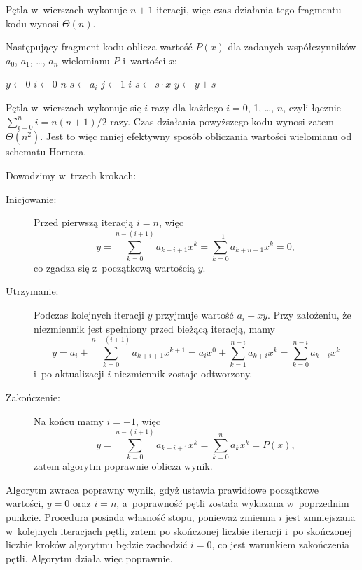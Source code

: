 
\subproblem %
Pętla  w~wierszach  wykonuje $n+1$ iteracji, więc czas działania tego fragmentu kodu wynosi $\Theta(n)$.

\subproblem %
Następujący fragment kodu oblicza wartość $P(x)$ dla zadanych współczynników $a_0$, $a_1$, \dots, $a_n$ wielomianu $P$ i~wartości $x$:
\begin{codebox}
\li	$y\gets0$
\li	\For $i\gets0$ \To $n$
\li		\Do $s\gets a_i$
\li			\For $j\gets1$ \To $i$ \label{li:naive-polynomial-evaluation-for-begin}
\li				\Do $s\gets s\cdot x$
				\End \label{li:naive-polynomial-evaluation-for-end}
\li			$y\gets y+s$
		\End
\end{codebox}

Pętla  w~wierszach \doubledash{\ref{li:naive-polynomial-evaluation-for-begin}}{\ref{li:naive-polynomial-evaluation-for-end}} wykonuje się $i$ razy dla każdego $i=0$, 1, \dots, $n$, czyli łącznie $\sum_{i=0}^ni=n(n+1)/2$ razy.
Czas działania powyższego kodu wynosi zatem $\Theta(n^2)$.
Jest to więc mniej efektywny sposób obliczania wartości wielomianu od schematu Hornera.

\subproblem %
Dowodzimy w~trzech krokach:
\begin{description}
	\item[Inicjowanie:] Przed pierwszą iteracją $i=n$, więc
	\[
	    y = \sum_{k=0}^{n-(i+1)}a_{k+i+1}x^k = \sum_{k=0}^{-1}a_{k+n+1}x^k = 0,
	\]
	co zgadza się z~początkową wartością $y$.
	\item[Utrzymanie:] Podczas kolejnych iteracji $y$ przyjmuje wartość $a_i+xy$.
Przy założeniu, że niezmiennik jest spełniony przed bieżącą iteracją, mamy
	\[
		y = a_i+\sum_{k=0}^{n-(i+1)}a_{k+i+1}x^{k+1} = a_ix^0+\sum_{k=1}^{n-i}a_{k+i}x^k = \sum_{k=0}^{n-i}a_{k+i}x^k
	\]
	i~po aktualizacji $i$ niezmiennik zostaje odtworzony.
	\item[Zakończenie:] Na końcu mamy $i=-1$, więc
	\[
		y = \sum_{k=0}^{n-(i+1)}a_{k+i+1}x^k = \sum_{k=0}^na_kx^k = P(x),
	\]
	zatem algorytm poprawnie oblicza wynik.
\end{description}

\subproblem %
Algorytm zwraca poprawny wynik, gdyż ustawia prawidłowe początkowe wartości, $y=0$ oraz $i=n$, a~poprawność pętli  została wykazana w~poprzednim punkcie.
Procedura posiada własność stopu, ponieważ zmienna $i$ jest zmniejszana w~kolejnych iteracjach pętli, zatem po skończonej liczbie iteracji i~po skończonej liczbie kroków algorytmu będzie zachodzić $i=0$, co jest warunkiem zakończenia pętli.
Algorytm działa więc poprawnie.
